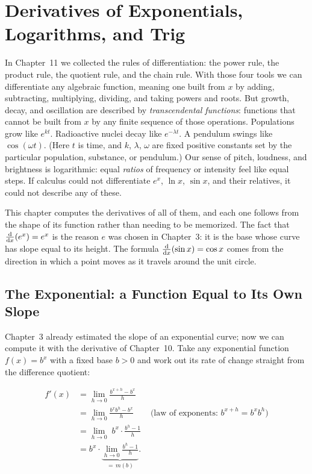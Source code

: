 \chapter{Derivatives of Exponentials, Logarithms, and Trig}

In Chapter~11 we collected the rules of differentiation: the power rule, the
product rule, the quotient rule, and the chain rule. With those four tools we
can differentiate any algebraic function, meaning one built from $x$ by
adding, subtracting, multiplying, dividing, and taking powers and roots. But
growth, decay, and oscillation are described by \emph{transcendental
functions}: functions that cannot be built from $x$ by any finite sequence of
those operations.
Populations grow like $e^{kt}$. Radioactive nuclei decay like $e^{-\lambda t}$.
A pendulum swings like $\cos(\omega t)$. (Here $t$ is time, and $k$, $\lambda$,
$\omega$ are fixed positive constants set by the particular population,
substance, or pendulum.) Our sense of pitch, loudness, and brightness is
logarithmic: equal \emph{ratios} of frequency or intensity feel like equal
steps. If calculus could not differentiate $e^x$, $\ln x$, $\sin x$, and their
relatives, it could not describe any of these.

This chapter computes the derivatives of all of them, and each one follows
from the shape of its function rather than needing to be memorized. The
fact that $\frac{\mathrm{d}}{\mathrm{d} x}\!\left(e^x\right) = e^x$ is the reason $e$ was chosen in Chapter~3: it is
the base whose curve has slope equal to its height. The formula
$\frac{\mathrm{d}}{\mathrm{d} x}\!\left(\sin x\right) = \cos x$ comes from the direction in which a point moves as it
travels around the unit circle.

\chapterline

\section{The Exponential: a Function Equal to Its Own Slope}
\label{ch12:exp-intro}

Chapter~3 already estimated the slope of an exponential curve; now we can
compute it with the derivative of Chapter~10.
Take any exponential function $f(x) = b^x$ with a fixed base $b > 0$ and
work out its rate of change straight from the difference quotient:

\begin{align*}
f'(x)
&= \lim_{h \to 0} \frac{b^{x+h} - b^x}{h} \\[2pt]
&= \lim_{h \to 0} \frac{b^x b^h - b^x}{h}
   \qquad\text{(law of exponents: } b^{x+h}=b^x b^h\text{)}\\[2pt]
&= \lim_{h \to 0}\; b^x \cdot \frac{b^h - 1}{h} \\[2pt]
&= b^x \cdot \underbrace{\lim_{h \to 0} \frac{b^h - 1}{h}}_{\textstyle =\, m(b)}.
\end{align*}

